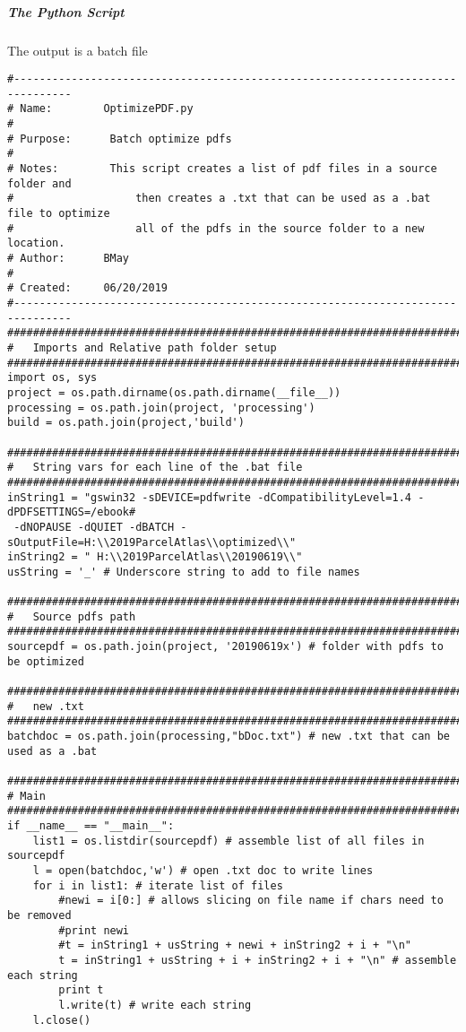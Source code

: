 \subparagraph{The Python Script}  The output is a batch file
{\begin{footnotesize}\color{orange}
\begin{verbatim}
#-------------------------------------------------------------------------------
# Name:        OptimizePDF.py
#
# Purpose:      Batch optimize pdfs
#
# Notes:        This script creates a list of pdf files in a source folder and
#                   then creates a .txt that can be used as a .bat file to optimize
#                   all of the pdfs in the source folder to a new location.
# Author:      BMay
#
# Created:     06/20/2019
#-------------------------------------------------------------------------------
################################################################################
#   Imports and Relative path folder setup
################################################################################
import os, sys
project = os.path.dirname(os.path.dirname(__file__))
processing = os.path.join(project, 'processing')
build = os.path.join(project,'build')

################################################################################
#   String vars for each line of the .bat file
################################################################################
inString1 = "gswin32 -sDEVICE=pdfwrite -dCompatibilityLevel=1.4 -dPDFSETTINGS=/ebook#
 -dNOPAUSE -dQUIET -dBATCH -sOutputFile=H:\\2019ParcelAtlas\\optimized\\"
inString2 = " H:\\2019ParcelAtlas\\20190619\\"
usString = '_' # Underscore string to add to file names

################################################################################
#   Source pdfs path
################################################################################
sourcepdf = os.path.join(project, '20190619x') # folder with pdfs to be optimized

################################################################################
#   new .txt
################################################################################
batchdoc = os.path.join(processing,"bDoc.txt") # new .txt that can be used as a .bat

################################################################################
# Main
################################################################################
if __name__ == "__main__":
    list1 = os.listdir(sourcepdf) # assemble list of all files in sourcepdf
    l = open(batchdoc,'w') # open .txt doc to write lines
    for i in list1: # iterate list of files
        #newi = i[0:] # allows slicing on file name if chars need to be removed
        #print newi
        #t = inString1 + usString + newi + inString2 + i + "\n"
        t = inString1 + usString + i + inString2 + i + "\n" # assemble each string
        print t
        l.write(t) # write each string
    l.close()
\end{verbatim}
\end{footnotesize}}

